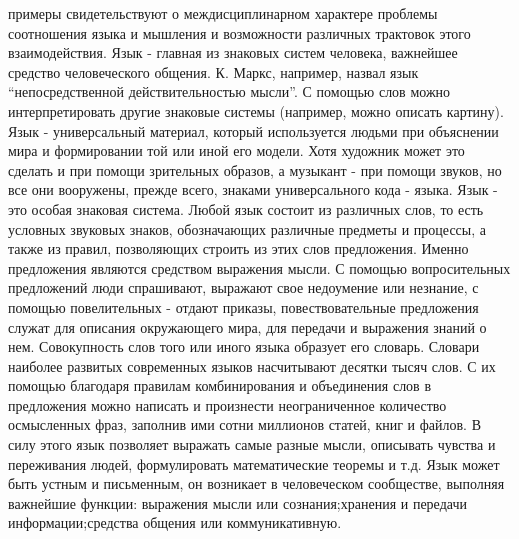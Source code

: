 \documentclass[12pt]{article}
\begin{document}
примеры свидетельствуют о междисциплинарном характере проблемы соотношения языка и мышления и
возможности различных трактовок этого взаимодействия.
Язык - главная из знаковых систем человека, важнейшее средство человеческого общения. К. Маркс, например,
назвал язык “непосредственной действительностью мысли”. С помощью слов можно интерпретировать другие
знаковые системы (например, можно описать картину). Язык - универсальный материал, который используется
людьми при объяснении мира и формировании той или иной его модели. Хотя художник может это сделать и
при помощи зрительных образов, а музыкант - при помощи звуков, но все они вооружены, прежде всего,
знаками универсального кода - языка. 
Язык - это особая знаковая система. Любой язык состоит из различных слов, то есть условных звуковых знаков,
обозначающих различные предметы и процессы, а также из правил, позволяющих строить из этих слов
предложения. Именно предложения являются средством выражения мысли. С помощью вопросительных
предложений люди спрашивают, выражают свое недоумение или незнание, с помощью повелительных - отдают
приказы, повествовательные предложения служат для описания окружающего мира, для передачи и выражения
знаний о нем. Совокупность слов того или иного языка образует его словарь. Словари наиболее развитых
современных языков насчитывают десятки тысяч слов. С их помощью благодаря правилам комбинирования и
объединения слов в предложения можно написать и произнести неограниченное количество осмысленных
фраз, заполнив ими сотни миллионов статей, книг и файлов. В силу этого язык позволяет выражать самые
разные мысли, описывать чувства и переживания людей, формулировать математические теоремы и т.д.
Язык может быть устным и письменным, он возникает в человеческом сообществе, выполняя важнейшие
функции: выражения мысли или сознания;хранения и передачи информации;средства общения или
коммуникативную.


\newpage
\end{document}
